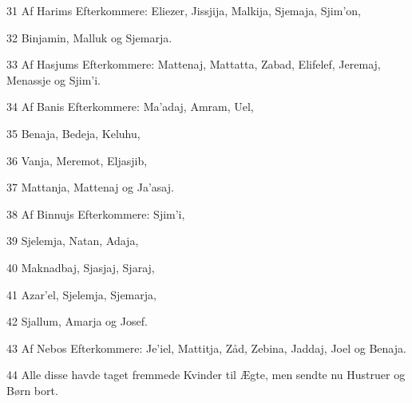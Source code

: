 \par 31 Af Harims Efterkommere: Eliezer, Jissjija, Malkija, Sjemaja, Sjim'on,
\par 32 Binjamin, Malluk og Sjemarja.
\par 33 Af Hasjums Efterkommere: Mattenaj, Mattatta, Zabad, Elifelef, Jeremaj, Menassje og Sjim'i.
\par 34 Af Banis Efterkommere: Ma'adaj, Amram, Uel,
\par 35 Benaja, Bedeja, Keluhu,
\par 36 Vanja, Meremot, Eljasjib,
\par 37 Mattanja, Mattenaj og Ja'asaj.
\par 38 Af Binnujs Efterkommere: Sjim'i,
\par 39 Sjelemja, Natan, Adaja,
\par 40 Maknadbaj, Sjasjaj, Sjaraj,
\par 41 Azar'el, Sjelemja, Sjemarja,
\par 42 Sjallum, Amarja og Josef.
\par 43 Af Nebos Efterkommere: Je'iel, Mattitja, Zåd, Zebina, Jaddaj, Joel og Benaja.
\par 44 Alle disse havde taget fremmede Kvinder til Ægte, men sendte nu Hustruer og Børn bort.


